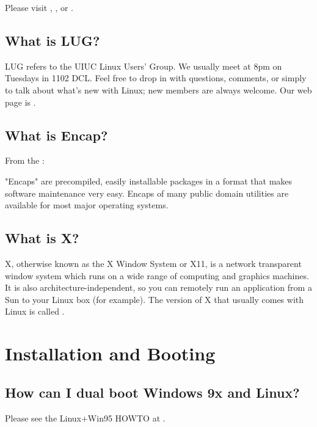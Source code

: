 \documentclass[a4paper]{article}
\begin{document}
Please visit
,
,
or .




\subsection{What is LUG?}

LUG refers to the UIUC Linux Users' Group.  We usually meet at 8pm on
Tuesdays in 1102 DCL.  Feel free to drop in with questions,
comments, or simply to talk about what's new with Linux; new members
are always welcome.  Our web page is .




\subsection{What is Encap?}

From the :

"Encaps" are precompiled, easily installable packages in a format that
makes software maintenance very easy. Encaps of many public domain
utilities are available for most major operating systems.




\subsection{What is X?}

X, otherwise known as the X Window System or X11, is a network
transparent window system which runs on a wide range of computing
and graphics machines.  It is also architecture-independent, so you can
remotely run an application from a Sun to your Linux box (for example).
The version of X that usually comes with Linux is called .




\section{Installation and Booting}


\subsection{How can I dual boot Windows 9x and Linux?}

Please see the Linux+Win95 HOWTO at .
\end{document}
